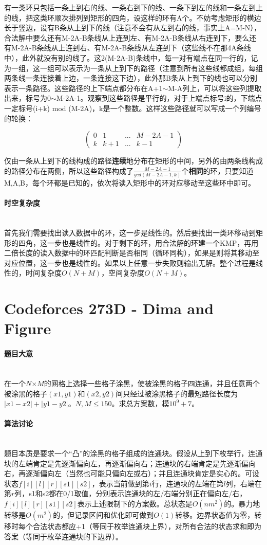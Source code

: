 \documentclass[UTF8]{ctexart}
\newcommand{\myparagraph}[1]{\paragraph{#1}\mbox{}\\}
\theoremstyle{nonumberplain}
\begin{document}
			有一类环只包括一条上到右的线、一条右到下的线、一条下到左的线和一条左到上的线，把这类环顺次排列到矩形的四角，设这样的环有A个。不妨考虑矩形的横边长于竖边，设有B条从上到下的线（注意不会有从左到右的线，事实上A=M-N），合法解中要么还有M-2A-B条线从上连到左、有M-2A-B条线从右连到下，要么还有M-2A-B条线从上连到右、有M-2A-B条线从左连到下（这些线不在那4A条线中），此外就没有别的线了。这2(M-2A-B)条线中，每一对有端点在同一行的，记为一组，这一组可以表示为一条从上到下的路径（注意到所有这些线都成组，每组两条线一条连接着上边，一条连接这下边），此外那B条从上到下的线也可以分别表示一条路径。这些路径的上下端点都分布在A+1$\sim$M-A列上，可以将这些列提取出来，标号为0$\sim$M-2A-1。观察到这些路径是平行的，对于上端点标号i的，下端点一定标号(i+k) mod (M-2A)，k是一个整数。这样这些路径就可以写成一个列编号的轮换：
			
			$$\begin{pmatrix} 0 & 1 & ... & M-2A-1 \\ k & k+1 & ... & k-1 \end{pmatrix}$$
			
			仅由一条从上到下的线构成的路径\textbf{连续}地分布在矩形的中间，另外的由两条线构成的路径分布在两侧，所以这些路径构成了$\frac{M-2A-1}{gcd(M-2A-1,k)}$个\textbf{相同}的环，只要知道M,A,B，每个环都是已知的，依次将读入矩形中的环对应移动至这些环中即可。
		
		\myparagraph{时空复杂度}
		
			首先我们需要找出读入数据中的环，这一步是线性的。然后要找出一类环移动到矩形的四角，这一步也是线性的。对于剩下的环，用合法解的环建一个KMP，再用二倍长度的读入数据中的环匹配判断是否相同（循环同构），如果是则将其移动至对应位置，这一步也是线性的。如果以上任意一步失败则输出无解。整个过程是线性的，时间复杂度$O(N+M)$，空间复杂度$O(N+M)$。
	
	\section{Codeforces 273D - Dima and Figure}
	
		\myparagraph{题目大意}
		
			在一个$N$×$M$的网格上选择一些格子涂黑，使被涂黑的格子四连通，并且任意两个被涂黑的格子$(x1,y1)$和$(x2,y2)$间只经过被涂黑格子的最短路径长度为$|x1-x2|+|y1-y2|$。$N,M \leq 150$。求总方案数，模$10^9+7$。
		
		\myparagraph{算法讨论}
		
			题目本质是要求一个“凸”的涂黑的格子组成的连通块。假设从上到下枚举行，连通块的左端肯定是先逐渐偏向左，再逐渐偏向右；连通块的右端肯定是先逐渐偏向右，再逐渐偏向左（当然也可能只偏向左或右）；并且连通块肯定是实心的。可设状态$f[i][l][r][s1][s2]$，表示当前做到第$i$行，连通块的左端在第$l$列，右端在第$r$列，s1和s2都在0/1取值，分别表示连通块的左/右端分别正在偏向左/右，$f[i][l][r][s1][s2]$表示上述限制下的方案数。总状态是$O(nm^2)$的。暴力地转移是$O(m^2)$的，但记录区间和优化即可做到$O(1)$转移。边界状态值为零，转移时每个合法状态都应+1（等同于枚举连通块上界），对所有合法的状态求和即为答案（等同于枚举连通块的下边界）。
		
\end{document}
